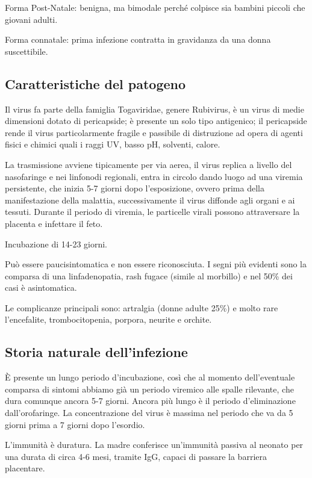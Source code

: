 Forma Post-Natale: benigna, ma bimodale perché colpisce sia bambini
piccoli che giovani adulti.

Forma connatale: prima infezione contratta in gravidanza da una donna
suscettibile.

\subsection{Caratteristiche del patogeno}

Il
virus fa parte della famiglia Togaviridae, genere Rubivirus, è un virus
di medie dimensioni dotato di pericapside; è presente un solo tipo
antigenico; il pericapside rende il virus particolarmente fragile e
passibile di distruzione ad opera di agenti fisici e chimici quali i
raggi UV, basso pH, solventi, calore.

La trasmissione avviene tipicamente per via aerea, il virus replica a
livello del nasofaringe e nei linfonodi regionali, entra in circolo
dando luogo ad una viremia persistente, che inizia 5-7 giorni dopo
l'esposizione, ovvero prima della manifestazione della malattia,
successivamente il virus diffonde agli organi e ai tessuti. Durante il
periodo di viremia, le particelle virali possono attraversare la
placenta e infettare il feto.

Incubazione di 14-23 giorni.

Può essere paucisintomatica e non
essere riconosciuta. I segni più evidenti sono la comparsa di una
linfadenopatia, rash fugace (simile al morbillo) e nel 50\% dei casi è
asintomatica.

Le complicanze principali sono: artralgia (donne adulte 25\%) e molto
rare l'encefalite, trombocitopenia, porpora, neurite e orchite.

\subsection{Storia naturale dell'infezione}

È presente un lungo periodo d'incubazione, così che al momento
dell'eventuale comparsa di sintomi abbiamo già un periodo viremico alle
spalle rilevante, che dura comunque ancora 5-7 giorni. Ancora più lungo
è il periodo d'eliminazione dall'orofaringe. La concentrazione del virus
è massima nel periodo che va da 5 giorni prima a 7 giorni dopo
l'esordio.

L'immunità è duratura. La madre conferisce un'immunità passiva al
neonato per una durata di circa 4-6 mesi, tramite IgG, capaci di passare
la barriera placentare.

